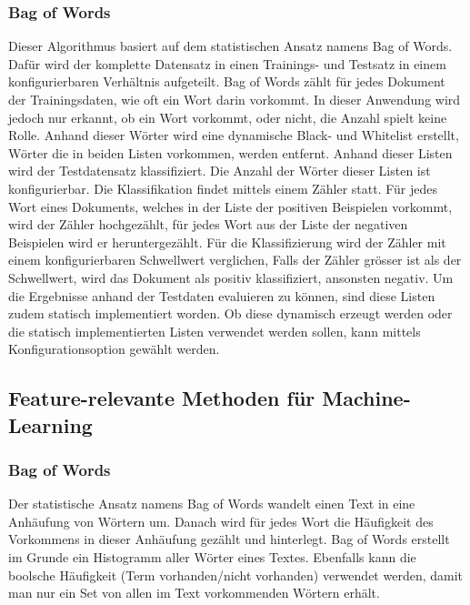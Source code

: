 \subsubsection{Bag of Words}
Dieser Algorithmus basiert auf dem statistischen Ansatz namens \glqq Bag of Words\grqq{}.
Dafür wird der komplette Datensatz in einen Trainings- und Testsatz in einem konfigurierbaren Verhältnis aufgeteilt.
Bag of Words zählt für jedes Dokument der Trainingsdaten, wie oft ein Wort darin vorkommt.
In dieser Anwendung wird jedoch nur erkannt, ob ein Wort vorkommt, oder nicht, die Anzahl spielt keine Rolle.
Anhand dieser Wörter wird eine dynamische Black- und Whitelist erstellt, Wörter die in beiden Listen vorkommen, werden entfernt.
Anhand dieser Listen wird der Testdatensatz klassifiziert.
Die Anzahl der Wörter dieser Listen ist konfigurierbar.
Die Klassifikation findet mittels einem Zähler statt.
Für jedes Wort eines Dokuments, welches in der Liste der positiven Beispielen vorkommt, wird der Zähler hochgezählt, für jedes Wort aus der Liste der negativen Beispielen wird er heruntergezählt.
Für die Klassifizierung wird der Zähler mit einem konfigurierbaren Schwellwert verglichen, Falls der Zähler grösser ist als der Schwellwert, wird das Dokument als positiv klassifiziert, ansonsten negativ.
Um die Ergebnisse anhand der Testdaten evaluieren zu können, sind diese Listen zudem statisch implementiert worden.
Ob diese dynamisch erzeugt werden oder die statisch implementierten Listen verwendet werden sollen, kann mittels Konfigurationsoption gewählt werden.
\subsection{Feature-relevante Methoden für Machine-Learning}
\subsubsection{Bag of Words}
Der statistische Ansatz namens \glqq Bag of Words\grqq{} wandelt einen Text in eine Anhäufung von Wörtern um.
Danach wird für jedes Wort die Häufigkeit des Vorkommens in dieser Anhäufung gezählt und hinterlegt.
Bag of Words erstellt im Grunde ein Histogramm aller Wörter eines Textes.
Ebenfalls kann die boolsche Häufigkeit (Term vorhanden/nicht vorhanden) verwendet werden, damit man nur ein Set von allen im Text vorkommenden Wörtern erhält.
